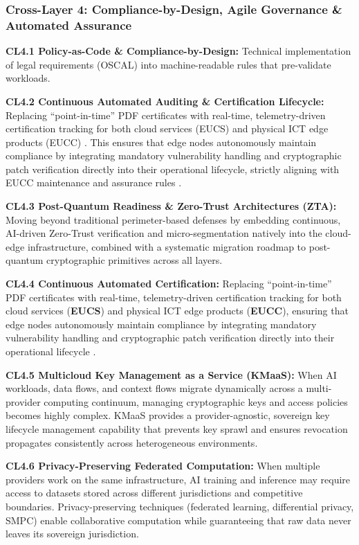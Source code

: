 \documentclass{ieeeaccess}
\begin{document}
\subsubsection*{Cross-Layer 4: Compliance-by-Design, Agile Governance \& Automated Assurance}
\textbf{CL4.1 Policy-as-Code \& Compliance-by-Design:} Technical implementation of legal requirements (OSCAL) into machine-readable rules that pre-validate workloads.

\textbf{CL4.2 Continuous Automated Auditing \& Certification Lifecycle:} Replacing ``point-in-time''  PDF certificates with real-time, telemetry-driven certification tracking for both cloud services (EUCS) \cite{eucs} and physical ICT edge products (EUCC) \cite{eucc}. This ensures that edge nodes autonomously maintain compliance by integrating mandatory vulnerability handling and cryptographic patch verification directly into their operational lifecycle, strictly aligning with EUCC maintenance and assurance rules \cite{eucc}.

\textbf{CL4.3 Post-Quantum Readiness \& Zero-Trust Architectures (ZTA):} Moving beyond traditional perimeter-based defenses by embedding continuous, AI-driven Zero-Trust verification and micro-segmentation natively into the cloud-edge infrastructure, combined with a systematic migration roadmap to post-quantum cryptographic primitives across all layers.

\textbf{CL4.4 Continuous Automated Certification:} Replacing ``point-in-time'' PDF certificates with real-time, telemetry-driven certification tracking for both cloud services (\textbf{EUCS}) and physical ICT edge products (\textbf{EUCC}), ensuring that edge nodes autonomously maintain compliance by integrating mandatory vulnerability handling and cryptographic patch verification directly into their operational lifecycle \cite{eucc}.

\textbf{CL4.5 Multicloud Key Management as a Service (KMaaS):} When AI workloads, data flows, and context flows migrate dynamically across a multi-provider computing continuum, managing cryptographic keys and access policies becomes highly complex. KMaaS provides a provider-agnostic, sovereign key lifecycle management capability that prevents key sprawl and ensures revocation propagates consistently across heterogeneous environments.

\textbf{CL4.6 Privacy-Preserving Federated Computation:} When multiple providers work on the same infrastructure, AI training and inference may require access to datasets stored across different jurisdictions and competitive boundaries. Privacy-preserving techniques (federated learning, differential privacy, SMPC) enable collaborative computation while guaranteeing that raw data never leaves its sovereign jurisdiction.
\end{document}

